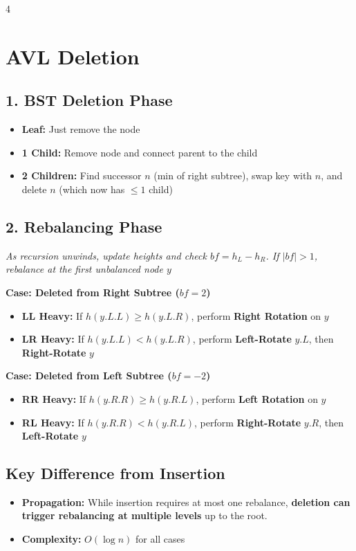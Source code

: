 \documentclass[fontsize=6pt, landscape, a4paper]{scrartcl}
\begin{document}
\begin{multicols*}{4}
    \section*{AVL Deletion}
    \subsection*{1. BST Deletion Phase}
    \begin{itemize}
        \item \textbf{Leaf:} Just remove the node
        \item \textbf{1 Child:} Remove node and connect parent to the child
        \item \textbf{2 Children:} Find successor $n$ (min of right subtree), swap key with $n$, and delete $n$ (which now has $\leq 1$ child)
    \end{itemize}

    \subsection*{2. Rebalancing Phase}
    \textit{As recursion unwinds, update heights and check $bf = h_L - h_R$. If $|bf| > 1$, rebalance at the first unbalanced node $y$}

    \textbf{Case: Deleted from Right Subtree ($bf = 2$)}
    \begin{itemize}
        \item \textbf{LL Heavy:} If $h(y.L.L) \geq h(y.L.R)$, perform \textbf{Right Rotation} on $y$
        \item \textbf{LR Heavy:} If $h(y.L.L) < h(y.L.R)$, perform \textbf{Left-Rotate} $y.L$, then \textbf{Right-Rotate} $y$
    \end{itemize}

    \textbf{Case: Deleted from Left Subtree ($bf = -2$)}
    \begin{itemize}
        \item \textbf{RR Heavy:} If $h(y.R.R) \geq h(y.R.L)$, perform \textbf{Left Rotation} on $y$
        \item \textbf{RL Heavy:} If $h(y.R.R) < h(y.R.L)$, perform \textbf{Right-Rotate} $y.R$, then \textbf{Left-Rotate} $y$
    \end{itemize}

    \subsection*{Key Difference from Insertion}
    \begin{itemize}
        \item \textbf{Propagation:} While insertion requires at most one rebalance, \textbf{deletion can trigger rebalancing at multiple levels} up to the root.
        \item \textbf{Complexity:} $O(\log n)$ for all cases
    \end{itemize}


\end{multicols*}
\end{document}
